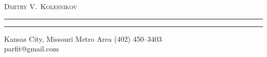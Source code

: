 \pagestyle{fancy}
\renewcommand{\headrulewidth}{0pt}
\setlength{\parindent}{0in}

\begin{center}
\begin{LARGE}
\textsc{Dmitry V.\ Kolesnikov}
\end{LARGE}
\end{center}
\vspace{-0.5mm}
\hrule
\vspace{0.3mm}
\hrule
\vspace{3mm}
\begin{small}\textnormal{Kansas City, Missouri Metro Area} \hfill \textnormal{\Telefon\hspace{1mm}(402) 450--3403}\\ %
\null \hfill \textnormal{\Letter\hspace{0.8mm}parfit@gmail.com}\\\end{small}
\vspace{2mm}